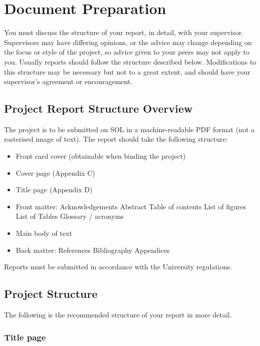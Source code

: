 \chapter{Document Preparation}

You must discuss the structure of your report, in detail, with your supervisor. Supervisors may have differing opinions, or the advice may change depending on the focus or style of the project, so advice given to your peers may not apply to you. Usually reports should follow the structure described below. Modifications to this structure may be necessary but not to a great extent, and should have your supervisor’s agreement or encouragement.

\section{Project Report Structure Overview}

The project is to be submitted on SOL in a machine-readable PDF format (not a rasterised image of text). The report should take the following structure:

\begin{itemize}
    \item Front card cover (obtainable when binding the project)
    \item Cover page (Appendix C)
    \item Title page (Appendix D)
    \item Front matter:
    \subitem Acknowledgements
    \subitem Abstract
    \subitem Table of contents
    \subitem List of figures
    \subitem List of Tables
    \subitem Glossary / acronyms
    \item Main body of text
    \item Back matter:
    \subitem References
    \subitem Bibliography
    \subitem Appendices  
\end{itemize}

Reports must be submitted in accordance with the University regulations.

\section{Project Structure}

The following is the recommended structure of your report in more detail.

\subsection{Title page}

